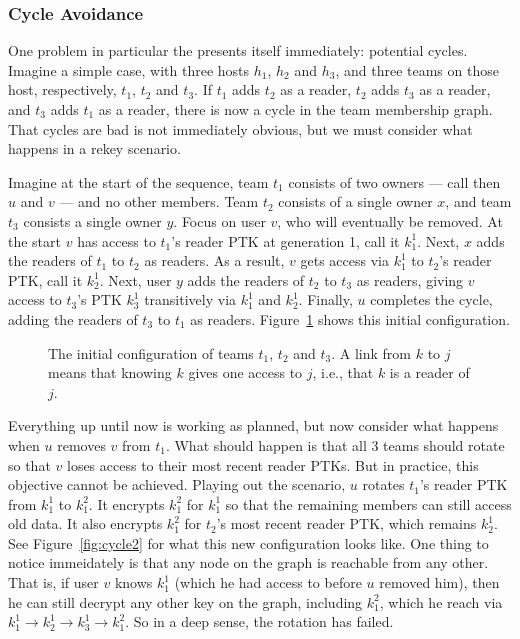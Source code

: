 \subsubsection{Cycle Avoidance}
\label{sec:team-index-range}

One problem in particular the presents itself immediately: potential cycles.
Imagine a simple case, with three hosts $h_1$, $h_2$ and $h_3$, and three teams
on those host, respectively, $t_1$, $t_2$ and $t_3$. If $t_1$ adds $t_2$ as a
reader, $t_2$ adds $t_3$ as a reader, and $t_3$ adds $t_1$ as a reader, there is
now a cycle in the team membership graph. That cycles are bad is not immediately
obvious, but we must consider what happens in a rekey scenario.

Imagine at the start of the sequence, team $t_1$ consists of two owners --- call
then $u$ and $v$ --- and no other members. Team $t_2$ consists of a single owner
$x$, and team $t_3$ consists a single owner $y$. Focus on user $v$, who will
eventually be removed.  At the start $v$ has access to $t_1$'s reader PTK at
generation 1, call it $k^{1}_{1}$.  Next, $x$ adds the readers of $t_1$ to $t_2$
as readers. As a result, $v$ gets access via $k_1^{1}$ to $t_2$'s reader PTK,
call it $k_2^{1}$. Next, user $y$ adds the readers of $t_2$ to $t_3$ as readers,
giving $v$ access to $t_3$'s PTK $k_3^{1}$ transitively via $k_1^1$ and $k_2^1$.
Finally, $u$ completes the cycle, adding the readers of $t_3$ to $t_1$ as readers.
Figure~\ref{fig:cycle1} shows this initial configuration. 

\begin{figure}[ht]
    \centering
    \caption{The initial configuration of teams $t_1$, $t_2$ and $t_3$.
A link from $k$ to $j$ means that knowing $k$ gives one access to $j$, i.e., that $k$ is a reader of $j$.}
    \label{fig:cycle1}
\end{figure}


Everything up until now is working as planned, but now consider what happens when
$u$ removes $v$ from $t_1$. What should happen is that all 3 teams should 
rotate so that $v$ loses access to their most recent reader PTKs. But in practice, this
objective cannot be achieved. Playing out the scenario, $u$ rotates $t_1$'s reader PTK
from $k_1^1$ to $k_1^2$. It encrypts $k_1^2$ for $k_1^1$ so that the remaining 
members can still access old data. It also encrypts $k_1^2$ for $t_2$'s most recent reader
PTK, which remains $k_2^1$. See Figure~\ref{fig:cycle2} for what this new configuration looks like.
One thing to notice immeidately is that any node on the graph is reachable from any other. That is,
if user $v$ knows $k_1^1$ (which he had access to before $u$ removed him), then he can still
decrypt any other key on the graph, including $k_1^2$, which he reach via
$k_1^1 \rightarrow k_2^1 \rightarrow k_3^1 \rightarrow k_1^2$. So in a deep sense, the 
rotation has failed. 

